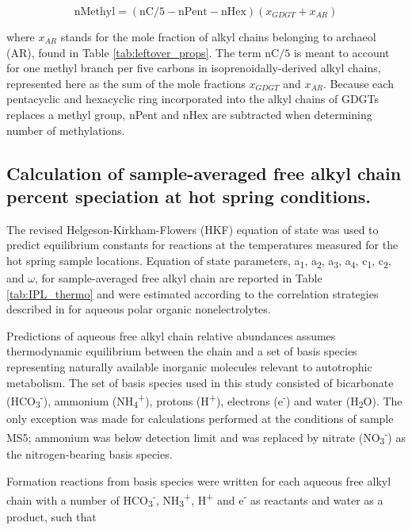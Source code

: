 \begin{equation}
\text{nMethyl} = (\text{nC}/5 - \text{nPent} - \text{nHex})(x_{GDGT} + x_{AR})
\end{equation}

\noindent where $x_{AR}$ stands for the mole fraction of alkyl chains belonging to archaeol (AR), found in Table \ref{tab:leftover_props}. The term nC$/5$ is meant to account for one methyl branch per five carbons in isoprenoidally-derived alkyl chains, represented here as the sum of the mole fractions $x_{GDGT}$ and $x_{AR}$. Because each pentacyclic and hexacyclic ring incorporated into the alkyl chains of GDGTs replaces a methyl group, nPent and nHex are subtracted when determining number of methylations.


\subsection{Calculation of sample-averaged free alkyl chain percent speciation at hot spring conditions.} The revised Helgeson-Kirkham-Flowers (HKF) equation of state \citep{shock1992calculation} was used to predict equilibrium constants for reactions at the temperatures measured for the hot spring sample locations. Equation of state parameters, a\textsubscript{1}, a\textsubscript{2}, a\textsubscript{3}, a\textsubscript{4}, c\textsubscript{1}, c\textsubscript{2}, and $\omega$, for sample-averaged free alkyl chain are reported in Table \ref{tab:IPL_thermo} and were estimated according to the correlation strategies described in \cite{plyasunov2001correlation} for aqueous polar organic nonelectrolytes.

Predictions of aqueous free alkyl chain relative abundances assumes thermodynamic equilibrium between the chain and a set of basis species representing naturally available inorganic molecules relevant to autotrophic metabolism. The set of basis species used in this study consisted of bicarbonate (HCO\textsubscript{3}\textsuperscript{-}), ammonium (NH\textsubscript{4}\textsuperscript{+}), protons (H\textsuperscript{+}), electrons (e\textsuperscript{-}) and water (H\textsubscript{2}O). The only exception was made for calculations performed at the conditions of sample MS5; ammonium was below detection limit and was replaced by nitrate (NO\textsubscript{3}\textsuperscript{-}) as the nitrogen-bearing basis species.

Formation reactions from basis species were written for each aqueous free alkyl chain with a number of HCO\textsubscript{3}\textsuperscript{-}, NH\textsubscript{3}\textsuperscript{+}, H\textsuperscript{+} and e\textsuperscript{-} as reactants and water as a product, such that


